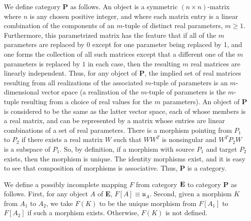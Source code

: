 \documentclass{amsart}
\numberwithin{equation}{section}
\theoremstyle{definition}
\numberwithin{theorem}{section}
\begin{document}
We define category {\bf P} as follows. An object is a symmetric $(n\times n)$-matrix where $n$ is any chosen positive integer, and where each matrix entry is a linear combination of the components of an $m$-tuple of distinct real parameters, $m\ge 1$.  Furthermore, this parametrized matrix has the feature that if all of the $m$ parameters are replaced by 0 except for one parameter being replaced by 1, and one forms the collection of all such matrices except that a different one of the $m$ parameters is replaced by $1$ in each case, then the resulting $m$ real matrices are linearly independent.  Thus, for any object of {\bf P}, the implied set of real matrices resulting from all realizations of the associated $m$-tuple of parameters is an $m$-dimensional vector space (a realization of the $m$-tuple of parameters is the $m$-tuple resulting from a choice of real values for the $m$ parameters).  An object of {\bf P} is considered to be the same as the latter vector space, each of whose members is a real matrix, and can be represented by a matrix whose entries are linear combinations of a set of real parameters.   There is a morphism pointing from $P_1$ to $P_2$ if there exists a real matrix $W$ such that $WW^T$ is nonsingular and $W^TP_2W$ is a subspace of $P_1$.   So, by definition, if a morphism with source $P_1$ and target $P_2$ exists, then the morphism is unique.
The identity morphisms exist, and it is easy to see that composition of morphisms is associative.  Thus, {\bf P} is a category.

We define a possibly incomplete mapping $F$ from category ${\bf E}$ to category {\bf P} as follows.  First, for any object $A$ of {\bf E}, $F[
A] \equiv \mathfrak{u}_A$.  Second, given a morphism $K$ from $A_1$ to $A_2$, we take $F(K)$ to be the unique morphism from $F[A_1]$ to $F[A_2]$ if such a morphism exists. Otherwise, $F(K)$ is not defined.   
\end{document}
